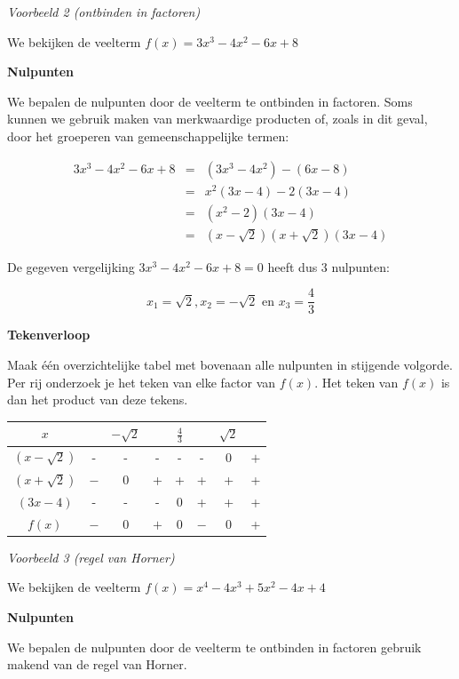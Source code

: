 \emph{Voorbeeld 2 (ontbinden in factoren)}

We bekijken de veelterm $f(x)=3x^{3}-4x^{2}-6x+8$

\textbf{Nulpunten}

We bepalen de nulpunten door de veelterm te ontbinden in
factoren. Soms kunnen we gebruik maken van merkwaardige producten
of, zoals in dit geval, door het groeperen van gemeenschappelijke
termen:

\begin{eqnarray*}
3x^{3}-4x^{2}-6x+8 & = & (3x^{3}-4x^{2})-(6x-8)\\
 & = & x^{2}(3x-4)-2(3x-4)\\
 & = & (x^{2}-2)(3x-4)\\
 & = & (x-\sqrt{2})(x+\sqrt{2})(3x-4)
\end{eqnarray*}

\noindent De gegeven vergelijking $3x^{3}-4x^{2}-6x+8=0$ heeft dus
3 nulpunten:

\begin{equation*}
x_{1}=\sqrt{2}, x_{2}=-\sqrt{2} \text{ en } x_{3}=\frac{4}{3}
\end{equation*}

\textbf{Tekenverloop}

Maak \'e\'en overzichtelijke tabel met bovenaan alle nulpunten
in stijgende volgorde. Per rij onderzoek je het teken van elke factor
van $f(x)$. Het teken van $f(x)$ is dan het product van deze tekens.

\begin{center}
\begin{tabular}{c||ccccccc}
$x$ &  & $-\sqrt{2}$ &  & $\frac{4}{3}$ &  & $\sqrt{2}$ & \\
\hline 
$(x-\sqrt{2})$ & - & - & -& -& - & $0$ & $+$ \\
$(x+\sqrt{2})$ & $-$ & $0$ & + & + & +&+&+ \\
$(3x-4)$ & - & - & - & $0$ & +&+&+ \\
\hline 
$f(x)$ & $-$ & $0$ & $+$ & $0$ & $-$ & $0$ & + \\
\end{tabular}
\end{center}


\emph{Voorbeeld 3 (regel van Horner)}

We bekijken de veelterm $f(x)=x^{4}-4x^{3}+5x^{2}-4x+4$

\textbf{Nulpunten}

We bepalen de nulpunten door de veelterm te ontbinden in
factoren gebruik makend van de regel van Horner.

